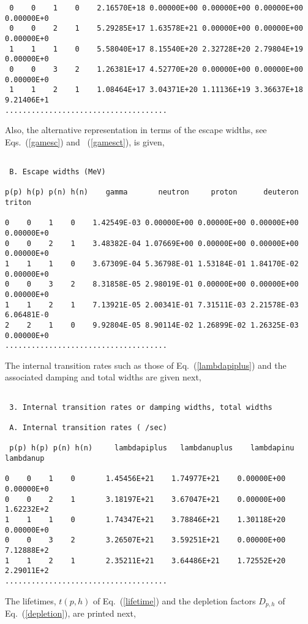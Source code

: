 \begin{samplecase}
{\begin{verbatim}
 0    0    1    0    2.16570E+18 0.00000E+00 0.00000E+00 0.00000E+00 0.00000E+0
 0    0    2    1    5.29285E+17 1.63578E+21 0.00000E+00 0.00000E+00 0.00000E+0
 1    1    1    0    5.58040E+17 8.15540E+20 2.32728E+20 2.79804E+19 0.00000E+0
 0    0    3    2    1.26381E+17 4.52770E+20 0.00000E+00 0.00000E+00 0.00000E+0
 1    1    2    1    1.08464E+17 3.04371E+20 1.11136E+19 3.36637E+18 9.21406E+1
.....................................
\end{verbatim} } \renewcommand{\baselinestretch}{1.07}\small\normalsize
\noindent
Also, the alternative representation in terms of the escape widths, see
Eqs.~(\ref{gamesc}) and ~(\ref{gamesct}), is given,

{\small \begin{verbatim}

 B. Escape widths (MeV)

p(p) h(p) p(n) h(n)    gamma       neutron     proton      deuteron    triton  

0    0    1    0    1.42549E-03 0.00000E+00 0.00000E+00 0.00000E+00 0.00000E+0
0    0    2    1    3.48382E-04 1.07669E+00 0.00000E+00 0.00000E+00 0.00000E+0
1    1    1    0    3.67309E-04 5.36798E-01 1.53184E-01 1.84170E-02 0.00000E+0
0    0    3    2    8.31858E-05 2.98019E-01 0.00000E+00 0.00000E+00 0.00000E+0
1    1    2    1    7.13921E-05 2.00341E-01 7.31511E-03 2.21578E-03 6.06481E-0
2    2    1    0    9.92804E-05 8.90114E-02 1.26899E-02 1.26325E-03 0.00000E+0
.....................................
\end{verbatim} } \renewcommand{\baselinestretch}{1.07}\small\normalsize
\noindent
The internal transition rates such as those of Eq.~(\ref{lambdapiplus}) and 
the associated damping and total widths are given next, 

{\small \begin{verbatim}

 3. Internal transition rates or damping widths, total widths

 A. Internal transition rates ( /sec)

 p(p) h(p) p(n) h(n)     lambdapiplus   lambdanuplus    lambdapinu     lambdanup

0    0    1    0       1.45456E+21    1.74977E+21    0.00000E+00    0.00000E+0
0    0    2    1       3.18197E+21    3.67047E+21    0.00000E+00    1.62232E+2
1    1    1    0       1.74347E+21    3.78846E+21    1.30118E+20    0.00000E+0
0    0    3    2       3.26507E+21    3.59251E+21    0.00000E+00    7.12888E+2
1    1    2    1       2.35211E+21    3.64486E+21    1.72552E+20    2.29011E+2
.....................................
\end{verbatim} } \renewcommand{\baselinestretch}{1.07}\small\normalsize
\noindent
The lifetimes, $t(p,h)$ of Eq.~(\ref{lifetime}) and the depletion factors 
$D_{p,h}$ of Eq.~(\ref{depletion}), are printed next, 


\end{samplecase}
